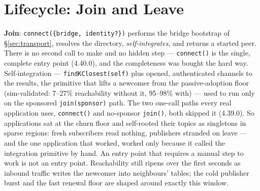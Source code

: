 \documentclass[nobib]{tufte-handout}
\begin{document}
\section{Lifecycle: Join and Leave}\label{sec:lifecycle}

\textbf{Join}: \texttt{connect(\{bridge, identity?\})} performs the
bridge bootstrap of \S\ref{sec:transport}, resolves the directory,
\emph{self-integrates}, and returns a started peer. There is no second
call to make and no hidden step --- \texttt{connect()} is the single,
complete entry point (4.40.0), and the completeness was bought the hard
way. Self-integration --- \texttt{findKClosest(self)} plus opened,
authenticated channels to the results, the primitive that lifts a
newcomer from the passive-adoption floor (sim-validated: 7--27\%
reachability without it, 95--98\% with) --- used to run only on the
sponsored \texttt{join(sponsor)} path. The two one-call paths every
real application uses, \texttt{connect()} and no-sponsor
\texttt{join()}, both skipped it (4.39.0). So applications sat at the
churn floor and self-rooted their topics as singletons in sparse
regions: fresh subscribers read nothing, publishers stranded on leave
--- and the one application that worked, worked only because it called
the integration primitive by hand. An entry point that requires a
manual step to work is not an entry point. Reachability still ripens
over the first seconds as inbound traffic writes the newcomer into
neighbours' tables; the cold publisher burst and the fast renewal floor
are shaped around exactly this window.
\end{document}
